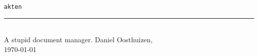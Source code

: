 \documentclass[a4paper]{article}
\begin{document}
\begin{titlepage}
  \centering
  \vspace{1in}
  \texttt{\Huge akten}\\
  \rule{4in}{0.4pt}\\
  \vspace{1in}
  {\Large A stupid document manager.}
  \vfill
  \raggedleft
  {\large Daniel Oosthuizen,\\
  \today}
\end{titlepage}
\end{document}
